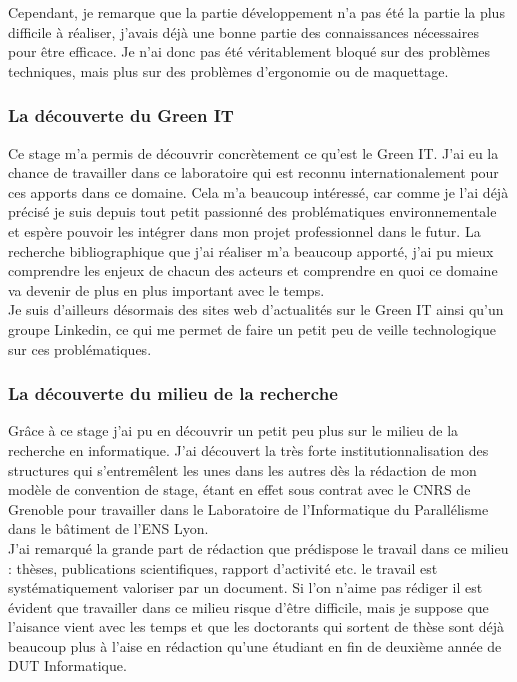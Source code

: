 Cependant, je remarque que la partie développement n'a pas été la partie la plus difficile à réaliser, j'avais déjà une bonne partie des connaissances nécessaires pour être efficace. Je n'ai donc pas été véritablement bloqué sur des problèmes techniques, mais plus sur des problèmes d'ergonomie ou de maquettage.

\subsubsection{La découverte du Green IT}
Ce stage m'a permis de découvrir concrètement ce qu'est le Green IT. J'ai eu la chance de travailler dans ce laboratoire qui est reconnu internationalement pour ces apports dans ce domaine. Cela m'a beaucoup intéressé, car comme je l'ai déjà précisé je suis depuis tout petit passionné des problématiques environnementale et espère pouvoir les intégrer dans mon projet professionnel dans le futur. La recherche bibliographique que j'ai réaliser m'a beaucoup apporté, j'ai pu mieux comprendre les enjeux de chacun des acteurs et comprendre en quoi ce domaine va devenir de plus en plus important avec le temps.\\

Je suis d'ailleurs désormais des sites web d'actualités sur le Green IT ainsi qu'un groupe Linkedin, ce qui me permet de faire un petit peu de veille technologique sur ces problématiques.

\subsubsection{La découverte du milieu de la recherche}
Grâce à ce stage j'ai pu en découvrir un petit peu plus sur le milieu de la recherche en informatique. J'ai découvert la très forte institutionnalisation des structures qui s'entremêlent les unes dans les autres dès la rédaction de mon modèle de convention de stage, étant en effet sous contrat avec le CNRS de Grenoble pour travailler dans le Laboratoire de l'Informatique du Parallélisme dans le bâtiment de l'ENS Lyon.\\

J'ai remarqué la grande part de rédaction que prédispose le travail dans ce milieu : thèses, publications scientifiques, rapport d'activité etc. le travail est systématiquement valoriser par un document. Si l'on n'aime pas rédiger il est évident que travailler dans ce milieu risque d'être difficile, mais je suppose que l'aisance vient avec les temps et que les doctorants qui sortent de thèse sont déjà beaucoup plus à l'aise en rédaction qu'une étudiant en fin de deuxième année de DUT Informatique.\\

